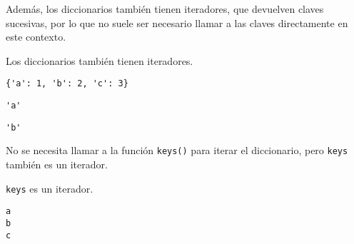 Además, los diccionarios también tienen iteradores, que devuelven claves
sucesivas, por lo que no suele ser necesario llamar a las claves
directamente en este contexto.\\

\begin{code} Los diccionarios también tienen iteradores.
\begin{Shaded}
\begin{Highlighting}[]
\end{Highlighting}
\end{Shaded}

\begin{verbatim}
{'a': 1, 'b': 2, 'c': 3}
\end{verbatim}

\begin{Shaded}
\begin{Highlighting}[]
\OperatorTok{=} 
\end{Highlighting}
\end{Shaded}

\begin{verbatim}
'a'
\end{verbatim}

\begin{Shaded}
\begin{Highlighting}[]
\end{Highlighting}
\end{Shaded}

\begin{verbatim}
'b'
\end{verbatim}
\end{code}

No se necesita llamar a la función \texttt{keys()} para iterar el
diccionario, pero \texttt{keys} también es un iterador.\\

\begin{code} \texttt{keys} es un iterador.
\begin{Shaded}
\begin{Highlighting}[]
\end{Highlighting}
\end{Shaded}

\begin{verbatim}
a
b
c

\end{verbatim}
\end{code}

